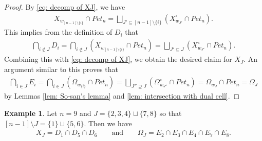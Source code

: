 \documentclass[11pt]{article}
\theoremstyle{definition}
\newtheorem{exam}[theo]{Example}
\numberwithin{equation}{section}
\numberwithin{equation}{section}
\begin{document}
\begin{proof}
By \eqref{eq: decomp of XJ}, we have
\begin{align*}
 X_{w_{[n-1]\setminus\{i\}}}\cap Pet_{n} = \bigsqcup_{J'\subseteq [n-1]\setminus\{i\}} (X^{\circ}_{w_{J'}}\cap Pet_{n}).
\end{align*}
This implies from the definition of $D_i$ that
\begin{align*}
 \bigcap_{i\notin J} D_i
 = \bigcap_{i\notin J} (X_{w_{[n-1]\setminus\{i\}}}\cap Pet_{n}) 
 = \bigsqcup_{J'\subseteq J} (X^{\circ}_{w_{J'}}\cap Pet_{n}).
\end{align*}
Combining this with \eqref{eq: decomp of XJ}, we obtain the desired claim for $X_J$. An argument similar to this proves that 
\begin{align*}
 \bigcap_{i\in J} E_i
 = \bigcap_{i\in J} (\Omega_{w_{\{i\}}}\cap Pet_{n}) 
 = \bigsqcup_{J''\supseteq J} (\Omega^{\circ}_{w_{J''}}\cap Pet_{n})
 = \Omega_{w_J}\cap Pet_{n}
 = \Omega_J
\end{align*}
by Lemmas \ref{lem: So-san's lemma} and \ref{lem: intersection with dual cell}.
\end{proof}

\begin{exam}\label{eg: intersection}
{\rm 
Let $n=9$ and $J=\{2,3,4\}\sqcup\{7,8\}$ so that $[n-1]\setminus J=\{1\}\sqcup\{5,6\}$. Then we have 
\begin{align*}
X_{J} = D_1\cap D_5\cap D_6
\qquad \text{and} \qquad
\Omega_{J} = E_2\cap E_3\cap E_4\cap E_7\cap E_8.
\end{align*}
}
\end{exam}
\end{document}
